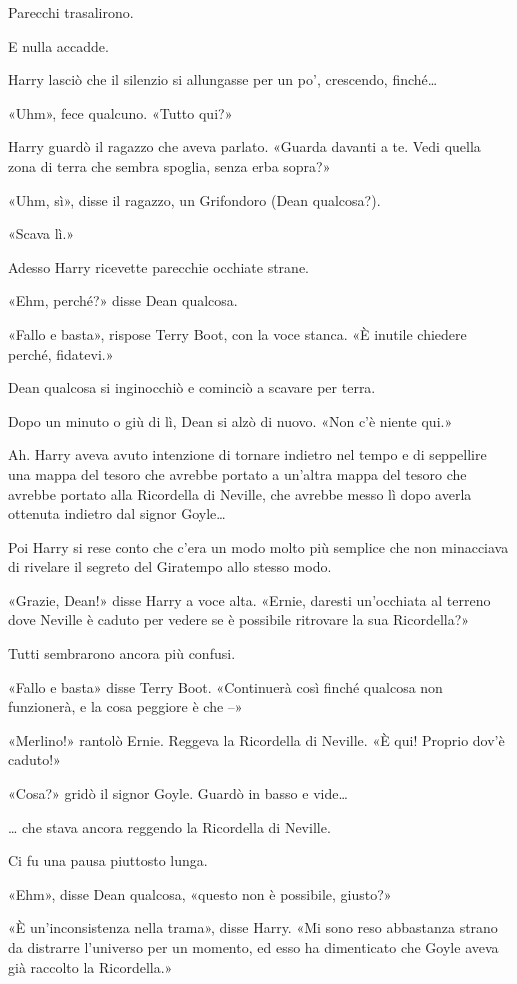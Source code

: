 Parecchi trasalirono.

E nulla accadde.

Harry lasciò che il silenzio si allungasse per un po’, crescendo, finché…

«Uhm», fece qualcuno. «Tutto qui?»

Harry guardò il ragazzo che aveva parlato. «Guarda davanti a te. Vedi quella zona di terra che sembra spoglia, senza erba sopra?»

«Uhm, sì», disse il ragazzo, un Grifondoro (Dean qualcosa?).

«Scava lì.»

Adesso Harry ricevette parecchie occhiate strane.

«Ehm, perché?» disse Dean qualcosa.

«Fallo e basta», rispose Terry Boot, con la voce stanca. «È inutile chiedere perché, fidatevi.»

Dean qualcosa si inginocchiò e cominciò a scavare per terra.

Dopo un minuto o giù di lì, Dean si alzò di nuovo. «Non c’è niente qui.»

Ah. Harry aveva avuto intenzione di tornare indietro nel tempo e di seppellire una mappa del tesoro che avrebbe portato a un’altra mappa del tesoro che avrebbe portato alla Ricordella di Neville, che avrebbe messo lì dopo averla ottenuta indietro dal signor Goyle…

Poi Harry si rese conto che c’era un modo molto più semplice che non minacciava di rivelare il segreto del Giratempo allo stesso modo.

«Grazie, Dean!» disse Harry a voce alta. «Ernie, daresti un’occhiata al terreno dove Neville è caduto per vedere se è possibile ritrovare la sua Ricordella?»

Tutti sembrarono ancora più confusi.

«Fallo e basta» disse Terry Boot. «Continuerà così finché qualcosa non funzionerà, e la cosa peggiore è che –»

«Merlino!» rantolò Ernie. Reggeva la Ricordella di Neville. «È qui! Proprio dov’è caduto!»

«Cosa?» gridò il signor Goyle. Guardò in basso e vide…

… che stava ancora reggendo la Ricordella di Neville.

Ci fu una pausa piuttosto lunga.

«Ehm», disse Dean qualcosa, «questo non è possibile, giusto?»

«È un’inconsistenza nella trama», disse Harry. «Mi sono reso abbastanza strano da distrarre l’universo per un momento, ed esso ha dimenticato che Goyle aveva già raccolto la Ricordella.»

